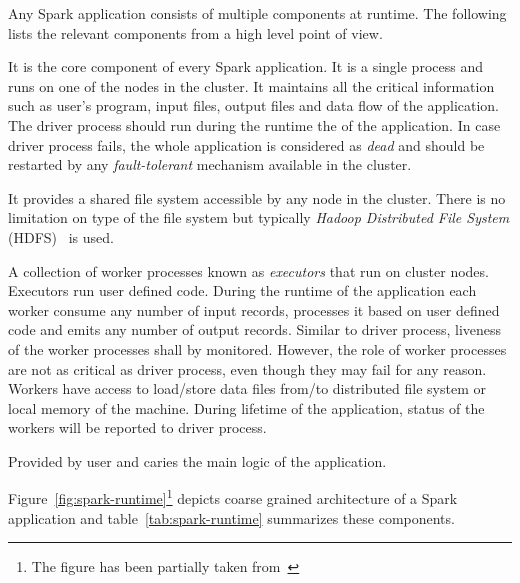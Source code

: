 Any Spark application consists of multiple components at runtime. The following lists the relevant components from a high level point of view.
\begin{description}[leftmargin=0pt]
    \item[Driver Process Driver] It is the core component of every Spark application. It is a single process and runs on one of the nodes in the cluster. It maintains all the critical information such as user's program, input files, output files and data flow of the application. The driver process should run during the runtime the of the application. In case driver process fails, the whole application is considered as \emph{dead} and should be restarted by any \emph{fault-tolerant} mechanism available in the cluster.
    \item[Distributed File System] It provides a shared file system accessible by any node in the cluster. There is no limitation on type of the file system but typically \emph{Hadoop Distributed File System} (HDFS)~\cite{hadoop} is used.
    \item[Worker Processes] A collection of worker processes known as \emph{executors} that run on cluster nodes. Executors run user defined code. During the runtime of the application each worker consume any number of input records, processes it based on user defined code and emits any number of output records. Similar to driver process, liveness of the worker processes shall by monitored. However, the role of worker processes are not as critical as driver process, even though they may fail for any reason. Workers have access to load/store data files from/to distributed file system or local memory of the machine. During lifetime of the application, status of the workers will be reported to driver process.
    \item[User Defined Code] Provided by user and caries the main logic of the application.
\end{description}
Figure~\ref{fig:spark-runtime}\footnote{The figure has been partially taken from~\cite{Zaharia:2012}} depicts coarse grained architecture of a Spark application and table~\ref{tab:spark-runtime} summarizes these components.

